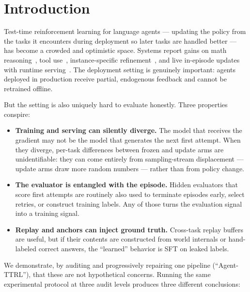 \section{Introduction}
Test-time reinforcement learning for language agents --- updating the
policy from the tasks it encounters during deployment so later tasks are
handled better --- has become a crowded and optimistic space. Systems
report gains on math reasoning~\cite{ttrl2025}, tool
use~\cite{t3rl2026}, instance-specific
refinement~\cite{staror2026}, and live in-episode updates with runtime
serving~\cite{att2026}. The deployment setting is genuinely important:
agents deployed in production receive partial, endogenous feedback and
cannot be retrained offline.

But the setting is also uniquely hard to evaluate honestly. Three
properties conspire:

\begin{itemize}
\item \textbf{Training and serving can silently diverge.} The model
  that receives the gradient may not be the model that generates the
  next first attempt. When they diverge, per-task differences between
  frozen and update arms are unidentifiable: they can come entirely
  from sampling-stream displacement --- update arms draw more random
  numbers --- rather than from policy change.
\item \textbf{The evaluator is entangled with the episode.} Hidden
  evaluators that score first attempts are routinely also used to
  terminate episodes early, select retries, or construct training
  labels. Any of those turns the evaluation signal into a training
  signal.
\item \textbf{Replay and anchors can inject ground truth.} Cross-task
  replay buffers are useful, but if their contents are constructed from
  world internals or hand-labeled correct answers, the ``learned''
  behavior is SFT on leaked labels.
\end{itemize}

We demonstrate, by auditing and progressively repairing one pipeline
(``Agent-TTRL''), that these are not hypothetical concerns. Running the
same experimental protocol at three audit levels produces three
different conclusions:

